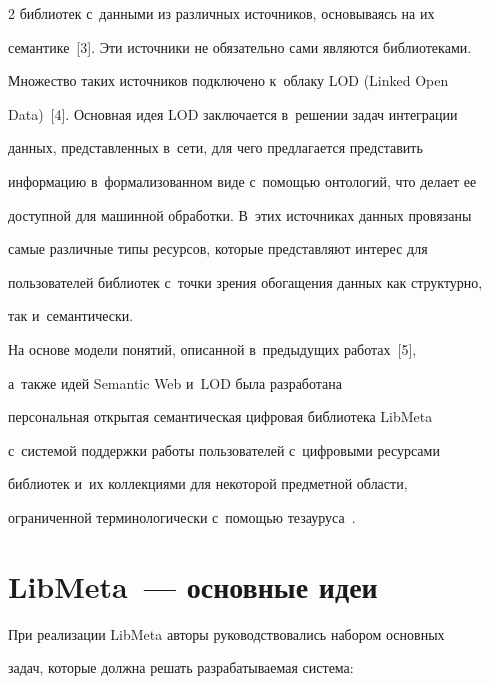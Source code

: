 \begin{multicols}{2}
библиотек с~данными из различных источников, основываясь на их 

семантике~[3]. Эти источники не обязательно сами являются библиотеками. 

Множество таких источников подключено к~облаку LOD (Linked Open 

Data)~[4]. Основная идея LOD заключается в~решении задач интеграции 

данных, представленных в~сети, для чего предлагается представить 

информацию в~формализованном виде с~по\-мощью онтологий, что делает ее 

доступной для машинной обработки. В~этих источниках данных провязаны 

самые различные типы ресурсов, которые представляют интерес для 

пользователей библиотек с~точки зрения обогащения данных как структурно, 

так и~семантически.

     

     На основе модели понятий, описанной в~предыду\-щих работах~[5], 

а~также идей Semantic Web и~LOD была разработана 

персональная открытая семантическая циф\-ро\-вая библиотека \mbox{LibMeta} 

с~системой поддержки работы пользователей с~циф\-ро\-вы\-ми ресурсами 

библиотек и~их коллекциями для некоторой предметной области, 

ограниченной терминологически с~помощью тезауруса~\cite{3-ser, 6-ser}.



\vspace*{-4pt}

     

\section{LibMeta~--- основные идеи}



\vspace*{-2pt}



     При реализации LibMeta авторы руководствовались набором основных 

задач, которые должна решать разрабатываемая система:

     \begin{enumerate}[(1)]


\end{enumerate}
\end{multicols}
